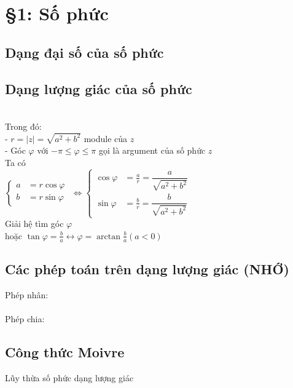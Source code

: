 \section{\S 1: Số phức}
\subsection{Dạng đại số của số phức}
\subsection{Dạng lượng giác của số phức}
\\
Trong đó: \\
- $r = |z| = \sqrt{a^2+b^2}$ module của $z$ \\
- Góc $\varphi$ với $-\pi \le \varphi \le \pi$ gọi là argument của số phức $z$ \\
Ta có \\
$\left\{
\begin{aligned}
	a &= r \cos{\varphi} \\
	b &= r \sin{\varphi}
\end{aligned}
\right.$
$\Longleftrightarrow \left\{
\begin{aligned}
	\cos{\varphi} &= \frac{a}{r} = \dfrac{a}{\sqrt{a^2+b^2}} \\
	\sin{\varphi} &= \frac{b}{r} = \dfrac{b}{\sqrt{a^2+b^2}}
\end{aligned}
\right.$ \\
Giải hệ tìm góc $\varphi$ \\
hoặc
$\tan \varphi = \frac{b}{a} \leftrightarrow \varphi = \arctan \frac{b}{a} (a < 0)$
\subsection{Các phép toán trên dạng lượng giác (NHỚ)}
Phép nhân:\\
 \\
Phép chia: \\
\subsection{Công thức Moivre}
Lũy thừa số phức dạng lượng giác \\
